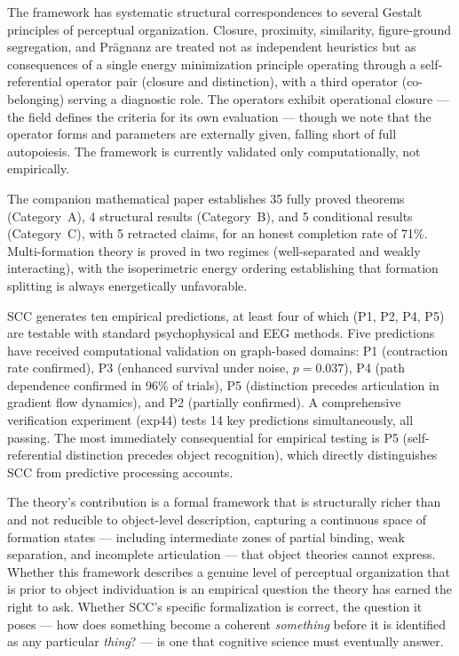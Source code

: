\documentclass[lettersize,journal]{IEEEtran}
\begin{document}
The framework has systematic structural correspondences to several Gestalt principles of perceptual organization. Closure, proximity, similarity, figure-ground segregation, and Pr\"{a}gnanz are treated not as independent heuristics but as consequences of a single energy minimization principle operating through a self-referential operator pair (closure and distinction), with a third operator (co-belonging) serving a diagnostic role. The operators exhibit operational closure --- the field defines the criteria for its own evaluation --- though we note that the operator forms and parameters are externally given, falling short of full autopoiesis. The framework is currently validated only computationally, not empirically.

The companion mathematical paper establishes 35 fully proved theorems (Category~A), 4 structural results (Category~B), and 5 conditional results (Category~C), with 5 retracted claims, for an honest completion rate of 71\%. Multi-formation theory is proved in two regimes (well-separated and weakly interacting), with the isoperimetric energy ordering establishing that formation splitting is always energetically unfavorable.

SCC generates ten empirical predictions, at least four of which (P1, P2, P4, P5) are testable with standard psychophysical and EEG methods. Five predictions have received computational validation on graph-based domains: P1 (contraction rate confirmed), P3 (enhanced survival under noise, $p = 0.037$), P4 (path dependence confirmed in 96\% of trials), P5 (distinction precedes articulation in gradient flow dynamics), and P2 (partially confirmed). A comprehensive verification experiment (exp44) tests 14 key predictions simultaneously, all passing. The most immediately consequential for empirical testing is P5 (self-referential distinction precedes object recognition), which directly distinguishes SCC from predictive processing accounts.

The theory's contribution is a formal framework that is structurally richer than and not reducible to object-level description, capturing a continuous space of formation states --- including intermediate zones of partial binding, weak separation, and incomplete articulation --- that object theories cannot express. Whether this framework describes a genuine level of perceptual organization that is prior to object individuation is an empirical question the theory has earned the right to ask. Whether SCC's specific formalization is correct, the question it poses --- how does something become a coherent \emph{something} before it is identified as any particular \emph{thing}? --- is one that cognitive science must eventually answer.
\end{document}
